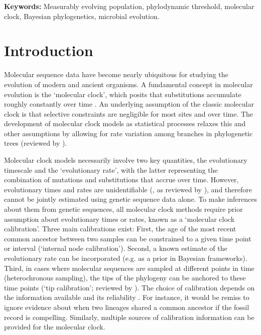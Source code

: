 \documentclass[11pt]{article}
\begin{document}
\textbf{Keywords:} Measurably evolving population, phylodynamic threshold, molecular clock, Bayesian phylogenetics, microbial evolution.

\section{Introduction}
Molecular sequence data have become nearly ubiquitous for studying the evolution of modern and ancient organisms. A fundamental concept in molecular evolution is the `molecular clock', which posits that substitutions accumulate roughly constantly over time \citep{zuckerkandl1965evolutionary}. An underlying assumption of the classic molecular clock is that selective constraints are negligible for most sites and over time. The development of molecular clock models as statistical processes relaxes this and other assumptions by allowing for rate variation among branches in phylogenetic trees (reviewed by \cite{ho2014molecular, guindon2020rates}).

Molecular clock models necessarily involve two key quantities, the evolutionary timescale and the `evolutionary rate', with the latter representing the combination of mutations and substitutions that accrue over time. However, evolutionary times and rates are unidentifiable (\cite{dos2013unbearable}, as reviewed by \cite{bromham2018bayesian}), and therefore cannot be jointly estimated using genetic sequence data alone. To make inferences about them from genetic sequences, all molecular clock methods require prior assumption about evolutionary times or rates, known as a `molecular clock calibration'. Three main calibrations exist: First, the age of the most recent common ancestor between two samples can be constrained to a given time point or interval (`internal node calibration'). Second, a known estimate of the evolutionary rate can be incorporated (e.g. as a prior in Bayesian frameworks). Third, in cases where molecular sequences are sampled at different points in time (heterochronous sampling), the tips of the phylogeny can be anchored to these time points (`tip calibration'; reviewed by \cite{rieux2016inferences}). The choice of calibration depends on the information available and its reliability \citep{warnock2012exploring, duchene2014impact}. For instance, it would be remiss to ignore evidence about when two lineages shared a common ancestor if the fossil record is compelling. Similarly, multiple sources of calibration information can be provided for the molecular clock.
\end{document}

